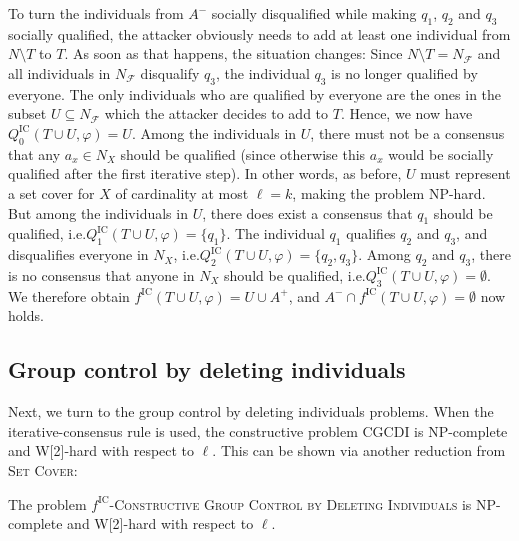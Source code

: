 \documentclass[
    12pt,               %
    a4paper,            %
    bibtotoc,           %
    pointlessnumbers,   %
    ngerman,            %
    titlepage,          %
    leqno,              %
    ]{scrarticle}       %
\begin{document}
\begin{Proof}
To turn the individuals from $A^-$ socially disqualified while making $q_1$, $q_2$ and $q_3$ socially qualified, the attacker obviously needs to add at least one individual from $N \setminus T$ to $T$. As soon as that happens, the situation changes: Since $N \setminus T = N_\mathcal{F}$ and all individuals in $N_\mathcal{F}$ disqualify $q_3$, the individual $q_3$ is no longer qualified by everyone. The only individuals who are qualified by everyone are the ones in the subset $U \subseteq N_\mathcal{F}$ which the attacker decides to add to $T$. Hence, we now have $Q^{\text{IC}}_0(T \cup U, \varphi) = U$. Among the individuals in $U$, there must not be a consensus that any $a_x \in N_X$ should be qualified (since otherwise this $a_x$ would be socially qualified after the first iterative step). In other words, as before, $U$ must represent a set cover for $X$ of cardinality at most $\ell = k$, making the problem NP-hard. But among the individuals in $U$, there does exist a consensus that $q_1$ should be qualified, i.e.\@ $Q^{\text{IC}}_1(T \cup U, \varphi) = \{q_1\}$. The individual $q_1$ qualifies $q_2$ and $q_3$, and disqualifies everyone in $N_X$, i.e.\@ $Q^{\text{IC}}_2(T \cup U, \varphi) = \{ q_2, q_3 \}$. Among $q_2$ and $q_3$, there is no consensus that anyone in $N_X$ should be qualified, i.e.\@ $Q^{\text{IC}}_3(T \cup U, \varphi) = \emptyset$. We therefore obtain $f^{\text{IC}}(T \cup U, \varphi) = U \cup A^+$, and $A^- \cap f^{\text{IC}}(T \cup U, \varphi) = \emptyset$ now holds.
\end{Proof}



\clearpage

\subsection{Group control by deleting individuals}

Next, we turn to the group control by deleting individuals problems. When the iterative-consensus rule is used, the constructive problem CGCDI is NP-complete and W[2]-hard with respect to $\ell$. This can be shown via another reduction from \textsc{Set Cover}:

\begin{Theorem} \label{thm:ic_cgcdi_npc}
The problem $f^{\text{IC}}$-\textsc{Constructive Group Control by Deleting Individuals} is NP-complete and W[2]-hard with respect to $\ell$.
\end{Theorem}
\end{document}
